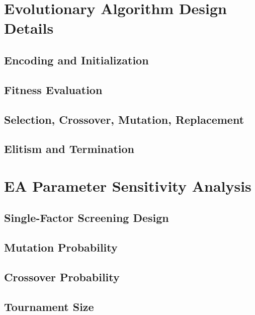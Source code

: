 \documentclass[12pt,a4paper]{report}
\begin{document}
\chapter{Evolutionary Algorithm Design Details}
\section{Encoding and Initialization}

\section{Fitness Evaluation}

\section{Selection, Crossover, Mutation, Replacement}

\section{Elitism and Termination}

\chapter{EA Parameter Sensitivity Analysis}
\section{Single-Factor Screening Design}

\section{Mutation Probability}

\section{Crossover Probability}

\section{Tournament Size}
\end{document}
